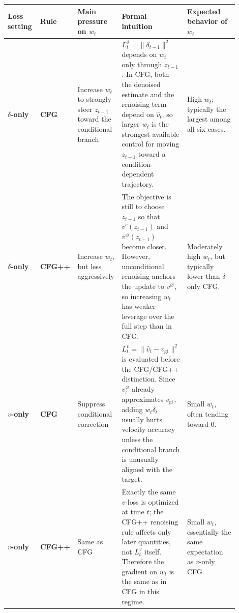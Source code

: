 \documentclass[acmtog]{acmart}
\begin{document}
\begin{table}[t]
\centering
\small
\setlength{\tabcolsep}{4pt}
\renewcommand{\arraystretch}{1.2}
\begin{tabular}{p{0.14\linewidth} p{0.11\linewidth} p{0.18\linewidth} p{0.25\linewidth} p{0.22\linewidth}}
\toprule
\textbf{Loss setting} & \textbf{Rule} & \textbf{Main pressure on \(w_t\)} & \textbf{Formal intuition} & \textbf{Expected behavior of \(w_t\)} \\
\midrule

\textbf{\(\delta\)-only} & \textbf{CFG} &
Increase \(w_t\) to strongly steer \(z_{t-1}\) toward the conditional branch &
\(L_t^\delta=\|\delta_{t-1}\|^2\) depends on \(w_t\) only through \(z_{t-1}\). In CFG, both the denoised estimate and the renoising term depend on \(\hat v_t\), so larger \(w_t\) is the strongest available control for moving \(z_{t-1}\) toward a condition-dependent trajectory. &
High \(w_t\); typically the largest among all six cases. \\

\midrule

\textbf{\(\delta\)-only} & \textbf{CFG++} &
Increase \(w_t\), but less aggressively &
The objective is still to choose \(z_{t-1}\) so that \(v^c(z_{t-1})\) and \(v^{\varnothing}(z_{t-1})\) become closer. However, unconditional renoising anchors the update to \(v^{\varnothing}\), so increasing \(w_t\) has weaker leverage over the full step than in CFG. &
Moderately high \(w_t\), but typically lower than \(\delta\)-only CFG. \\

\midrule

\textbf{\(v\)-only} & \textbf{CFG} &
Suppress conditional correction &
\(L_t^v=\|\hat v_t-v_{\mathrm{gt}}\|^2\) is evaluated before the CFG/CFG++ distinction. Since \(v_t^{\varnothing}\) already approximates \(v_{\mathrm{gt}}\), adding \(w_t\delta_t\) usually hurts velocity accuracy unless the conditional branch is unusually aligned with the target. &
Small \(w_t\), often tending toward \(0\). \\

\midrule

\textbf{\(v\)-only} & \textbf{CFG++} &
Same as CFG &
Exactly the same \(v\)-loss is optimized at time \(t\); the CFG++ renoising rule affects only later quantities, not \(L_t^v\) itself. Therefore the gradient on \(w_t\) is the same as in CFG in this regime. &
Small \(w_t\), essentially the same expectation as \(v\)-only CFG. \\


\end{tabular}
\end{table}
\end{document}
